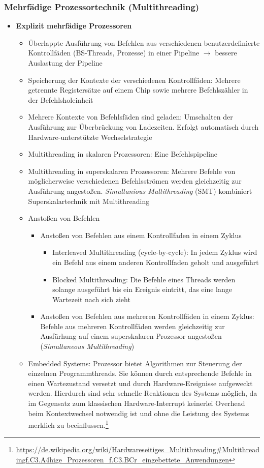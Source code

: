 \subsubsection{Mehrfädige Prozessortechnik (Multithreading)}
\begin{itemize}
	\item \textbf{Explizit mehrfädige Prozessoren}
	\begin{itemize}
		\item Überlappte Ausführung von Befehlen aus verschiedenen benutzerdefinierte Kontrollfäden (BS-Threads, Prozesse) in einer Pipeline \(\rightarrow\) bessere Auslastung der Pipeline
		\item Speicherung der Kontexte der verschiedenen Kontrollfäden: Mehrere getrennte Registersätze auf einem Chip sowie mehrere Befehlszähler in der Befehlsholeinheit
		\item Mehrere Kontexte von Befehlsfäden sind geladen: Umschalten der Ausführung zur Überbrückung von Ladezeiten. Erfolgt automatisch durch Hardware-unterstützte Wechselstrategie
		\item Multithreading in skalaren Prozessoren: Eine Befehlspipeline
		\item Multithreading in superskalaren Prozessoren: Mehrere Befehle von möglicherweise verschiedenen Befehlsströmen werden gleichzeitig zur Ausführung angestoßen. \textit{Simultanious Multithreading} (SMT) kombiniert Superskalartechnik mit Multithreading
		\item Anstoßen von Befehlen
		\begin{itemize}
			\item Anstoßen von Befehlen aus einem Kontrollfaden in einem Zyklus
			\begin{itemize}
				\item Interleaved Multithreading (cycle-by-cycle): In jedem Zyklus wird ein Befehl aus einem anderen Kontrollfaden geholt und ausgeführt
				\item Blocked Multithreading: Die Befehle eines Threads werden solange ausgeführt bis ein Ereignis eintritt, das eine lange Wartezeit nach sich zieht
			\end{itemize}
			\item Anstoßen von Befehlen aus mehreren Kontrollfäden in einem Zyklus: Befehle aus mehreren Kontrollfäden werden gleichzeitig zur Ausfürhung auf einem superskalaren Prozessor angestoßen (\textit{Simultaneous Multithreading})
		\end{itemize}
		\item Embedded Systems: Prozessor bietet Algorithmen zur Steuerung der einzelnen Programmthreads. Sie können durch entsprechende Befehle in einen Wartezustand versetzt und durch Hardware-Ereignisse aufgeweckt werden. Hierdurch sind sehr schnelle Reaktionen des Systems möglich, da im Gegensatz zum klassischen Hardware-Interrupt keinerlei Overhead beim Kontextwechsel notwendig ist und ohne die Leistung des Systems merklich zu beeinflussen.\footnote{\url{https://de.wikipedia.org/wiki/Hardwareseitiges_Multithreading\#Multithreadingf.C3.A4hige_Prozessoren_f.C3.BCr_eingebettete_Anwendungen}}

\end{itemize}
\end{itemize}
